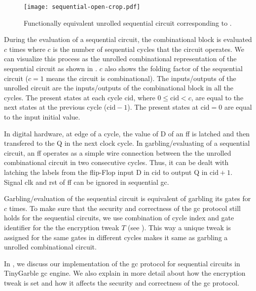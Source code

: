 \begin{figure}[h]
  \centering
  \texttt{[image: sequential-open-crop.pdf]}
  \caption{Functionally equivalent unrolled sequential circuit corresponding to .}
  \label{fig:open-sequential}
\end{figure}

During the evaluation of a sequential circuit, the combinational block is evaluated $c$ times where $c$ is the number of sequential cycles that the circuit operates.
We can visualize this process as the unrolled combinational representation of the sequential circuit as shown in .
$c$ also shows the folding factor of the sequential circuit ($c=1$ means the circuit is combinational).
The inputs/outputs of the unrolled circuit are the inputs/outputs of the combinational block in all the cycles.
The present states at each cycle $\textrm{cid}$, where $0 \le \textrm{cid} < c$, are equal to the next states at the previous cycle ($\textrm{cid}-1$).
The present states at $\textrm{cid}=0$ are equal to the input initial value.

In digital hardware, at edge of a cycle, the value of D of an \acrshort{ff} is latched and then transfered to the Q in the next clock cycle.
In garbling/evaluating of a sequential circuit, an \acrshort{ff} operates as a simple wire connection between the the unrolled combinational circuit in two consecutive cycles.
Thus, it can be dealt with latching the labels from the flip-Flop input D in $\textrm{cid}$ to output Q in $\textrm{cid}+1$.
Signal clk and rst of \acrshort{ff} can be ignored in sequential \acrshort{gc}.

Garbling/evaluation of the sequential circuit is equivalent of garbling its gates for $c$ times.
To make sure that the security and correctness of the \acrshort{gc} protocol still holds for the sequential circuits, we use combination of cycle index and gate identifier for the the encryption tweak $T$ (see ).
This way a unique tweak is assigned for the same gates in different cycles makes it same as garbling a unrolled combinational circuit.

In , we discuss our implementation of the \acrshort{gc} protocol for sequential circuits in TinyGarble \acrshort{gc} engine.
We also explain in more detail about how the encryption tweak is set and how it affects the security and correctness of the \acrshort{gc} protocol.

